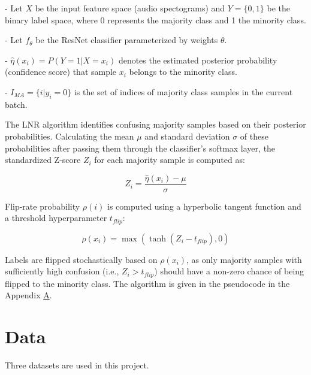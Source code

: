 \documentclass{article}
\begin{document}
- Let $X$ be the input feature space (audio spectograms) and $Y = \{0, 1\}$ be the binary label space, where 0 represents the majority class and 1 the minority class.

- Let $f_{\theta}$ be the ResNet classifier parameterized by weights $\theta$.

- $\hat{\eta}(x_i) = P(Y=1|X=x_i)$ denotes the estimated posterior probability (confidence score) that sample $x_i$ belongs to the minority class.

- $I_{MA} = \{i | y_i = 0\}$ is the set of indices of majority class samples in the current batch.

The LNR algorithm identifies confusing majority samples based on their posterior probabilities. Calculating the mean $\mu$ and standard deviation $\sigma$ of these probabilities after passing them through the classifier's softmax layer, the standardized Z-score $Z_i$ for each majority sample is computed as:

\vspace{-0.6\baselineskip}

$$Z_i = \frac{\hat{\eta}(x_i) - \mu}{\sigma}$$

\vspace{-0.6\baselineskip}


Flip-rate probability $\rho(i)$ is computed using a hyperbolic tangent function and a threshold hyperparameter $t_{flip}$:

\vspace{-0.6\baselineskip}

$$\rho(x_i) = \max(\tanh(Z_i - t_{flip}), 0)$$

\vspace{-0.2\baselineskip}

Labels are flipped stochastically based on $\rho(x_i)$, as only majority samples with sufficiently high confusion (i.e., $Z_i > t_{flip}$) should have a non-zero chance of being flipped to the minority class. The algorithm is given in the pseudocode in the Appendix \hyperref[sec:appendix]{A}.



\section{Data}

\vspace{-0.4\baselineskip}

Three datasets are used in this project.

\vspace{-0.4\baselineskip}
\end{document}
